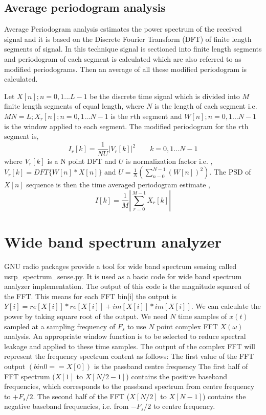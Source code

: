 \subsection{Average periodogram analysis}
Average Periodogram analysis estimates the power spectrum of the received signal
and it is based on the Discrete Fourier Transform (DFT) of finite length 
segments of signal. In this technique signal is sectioned into finite length 
segments and periodogram of each segment is calculated which are also referred 
to as modified periodograms. Then an average of all these modified periodogram 
is calculated\cite{welch67}.

Let $X[n]; n = 0,1...L-1$ be the discrete time signal which is  divided into 
$M$ 
finite length segments of equal length, where $N$ is the length of each segment  
i.e. $ MN = L; X_{r}[n]; n = 0,1...N-1 $ is the $r$th segment and
$ W[n]; n = 0,1...N-1 $ is 
the window applied to each segment. The modified periodogram for the $r$th segment
 is,
\begin{equation*}
    I_{r}[k] = \frac{1}{NU} \left| V_{r}[k]\right|^2     \qquad k = 0,1...N-1 
\end{equation*}
where $V_{r}[k]$ is a N point DFT and $U$ is normalization factor i.e. , 
$V_{r}[k] = DFT\{W[n]*X[n]\}$
and $U = \frac{1}{N}(\sum_{n-0}^{N-1} (W[n])^2)$. The PSD of $X[n]$ sequence 
is then the time averaged periodogram estimate ,
\begin{equation*}
    I[k] = \frac{1}{M}\left|\sum_{r=0}^{M-1}X_{r}[k]\right|
\end{equation*}

\section{Wide band spectrum analyzer}

GNU radio packages provide a tool for wide band spectrum sensing called 
usrp\_spectrum\_sense.py. 
It is used as a basic code for wide band spectrum analyzer implementation. The
output of this 
code is the magnitude squared of the FFT. This means for each FFT bin[i] the output 
is $ Y[i] = re[X[i]]*re[X[i]] + im[X[i]]*im[X[i]]$. We can calculate the power by
taking square root of the output. We need $N$ time samples of $x(t)$ sampled at a 
sampling frequency of $F_{s}$ to use $N$ point complex FFT $X(\omega)$ analysis. An 
appropriate window function is to be selected to reduce spectral leakage and 
applied to these time samples. The output of the complex FFT will represent the 
frequency spectrum content as follows: The first value of the FFT output 
$(bin0 == X[0])$ is the passband centre frequency The first half of FFT 
spectrum ($X[1]$ to $X[N/2-1]$) contains the positive baseband frequencies,
which corresponds
to the passband spectrum from centre frequency to $+F_{s}/2$. The second half of the 
FFT ($X[N/2]$ to $X[N-1]$) contains the negative baseband frequencies, i.e. from 
$-F_{s}/2$ to centre frequency.



